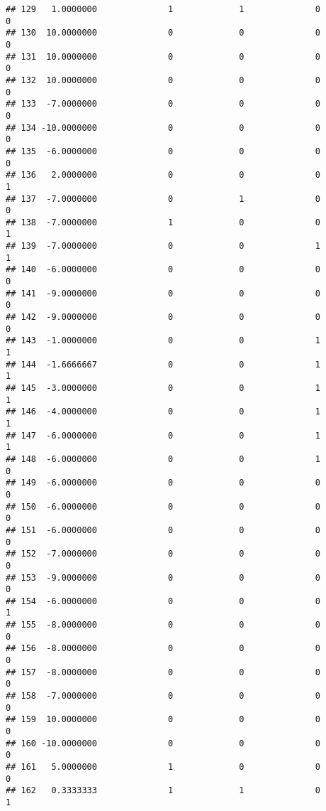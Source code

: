 \documentclass[
]{article}
\begin{document}
\begin{verbatim}
## 129   1.0000000              1             1              0             0
## 130  10.0000000              0             0              0             0
## 131  10.0000000              0             0              0             0
## 132  10.0000000              0             0              0             0
## 133  -7.0000000              0             0              0             0
## 134 -10.0000000              0             0              0             0
## 135  -6.0000000              0             0              0             0
## 136   2.0000000              0             0              0             1
## 137  -7.0000000              0             1              0             0
## 138  -7.0000000              1             0              0             1
## 139  -7.0000000              0             0              1             1
## 140  -6.0000000              0             0              0             0
## 141  -9.0000000              0             0              0             0
## 142  -9.0000000              0             0              0             0
## 143  -1.0000000              0             0              1             1
## 144  -1.6666667              0             0              1             1
## 145  -3.0000000              0             0              1             1
## 146  -4.0000000              0             0              1             1
## 147  -6.0000000              0             0              1             1
## 148  -6.0000000              0             0              1             0
## 149  -6.0000000              0             0              0             0
## 150  -6.0000000              0             0              0             0
## 151  -6.0000000              0             0              0             0
## 152  -7.0000000              0             0              0             0
## 153  -9.0000000              0             0              0             0
## 154  -6.0000000              0             0              0             1
## 155  -8.0000000              0             0              0             0
## 156  -8.0000000              0             0              0             0
## 157  -8.0000000              0             0              0             0
## 158  -7.0000000              0             0              0             0
## 159  10.0000000              0             0              0             0
## 160 -10.0000000              0             0              0             0
## 161   5.0000000              1             0              0             0
## 162   0.3333333              1             1              0             1

\end{verbatim}
\end{document}

